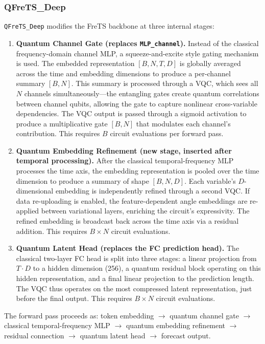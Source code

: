 \documentclass[11pt]{article}
\begin{document}
\subsubsection*{QFreTS\_Deep}

\texttt{QFreTS\_Deep} modifies the FreTS backbone at three internal stages:

\begin{enumerate}
  \item \textbf{Quantum Channel Gate (replaces \texttt{MLP\_channel}).} Instead of the classical frequency-domain channel MLP, a squeeze-and-excite style gating mechanism is used. The embedded representation $[B, N, T, D]$ is globally averaged across the time and embedding dimensions to produce a per-channel summary $[B, N]$. This summary is processed through a VQC, which sees all $N$ channels simultaneously---the entangling gates create quantum correlations between channel qubits, allowing the gate to capture nonlinear cross-variable dependencies. The VQC output is passed through a sigmoid activation to produce a multiplicative gate $[B, N]$ that modulates each channel's contribution. This requires $B$ circuit evaluations per forward pass.

  \item \textbf{Quantum Embedding Refinement (new stage, inserted after temporal processing).} After the classical temporal-frequency MLP processes the time axis, the embedding representation is pooled over the time dimension to produce a summary of shape $[B, N, D]$. Each variable's $D$-dimensional embedding is independently refined through a second VQC. If data re-uploading is enabled, the feature-dependent angle embeddings are re-applied between variational layers, enriching the circuit's expressivity. The refined embedding is broadcast back across the time axis via a residual addition. This requires $B \times N$ circuit evaluations.

  \item \textbf{Quantum Latent Head (replaces the FC prediction head).} The classical two-layer FC head is split into three stages: a linear projection from $T \cdot D$ to a hidden dimension (256), a quantum residual block operating on this hidden representation, and a final linear projection to the prediction length. The VQC thus operates on the most compressed latent representation, just before the final output. This requires $B \times N$ circuit evaluations.
\end{enumerate}

The forward pass proceeds as: token embedding $\rightarrow$ quantum channel gate $\rightarrow$ classical temporal-frequency MLP $\rightarrow$ quantum embedding refinement $\rightarrow$ residual connection $\rightarrow$ quantum latent head $\rightarrow$ forecast output.
\end{document}
